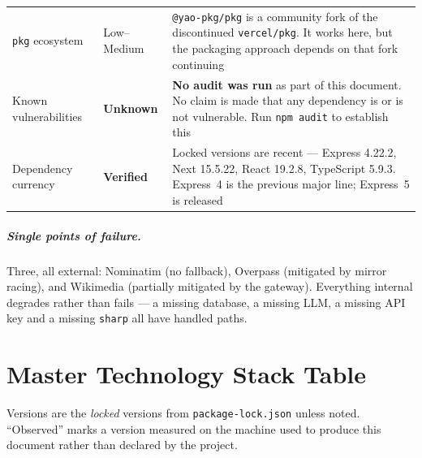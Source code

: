 \documentclass[11pt,a4paper]{report}
\newcommand{\code}[1]{\texttt{\small #1}}
\DeclareRobustCommand{\file}[1]{{\small\nolinkurl{#1}}}
\newcommand{\lblV}{\textcolor{cBack}{\textbf{Verified}}}
\newcommand{\lblU}{\textcolor{cNote}{\textbf{Unknown}}}
\begin{document}
\begin{longtable}{@{}>{\raggedright\arraybackslash}p{3.2cm}>{\raggedright\arraybackslash}p{2.6cm}>{\raggedright\arraybackslash}p{8.9cm}@{}}
\code{pkg} ecosystem & Low--Medium & \code{@yao-pkg/pkg} is a community fork of the discontinued \code{vercel/pkg}. It works here, but the packaging approach depends on that fork continuing\\
Known vulnerabilities & \lblU & \textbf{No audit was run} as part of this document. No claim is made that any dependency is or is not vulnerable. Run \code{npm audit} to establish this\\
Dependency currency & \lblV & Locked versions are recent --- Express 4.22.2, Next 15.5.22, React 19.2.8, TypeScript 5.9.3. Express~4 is the previous major line; Express~5 is released\\
\end{longtable}

\paragraph{Single points of failure.} Three, all external: Nominatim (no
fallback), Overpass (mitigated by mirror racing), and Wikimedia (partially
mitigated by the gateway). Everything internal degrades rather than fails --- a
missing database, a missing LLM, a missing API key and a missing \code{sharp} all
have handled paths.

\chapter{Master Technology Stack Table}
\label{sec:master}

Versions are the \emph{locked} versions from \file{package-lock.json} unless
noted. ``Observed'' marks a version measured on the machine used to produce this
document rather than declared by the project.
\end{document}
